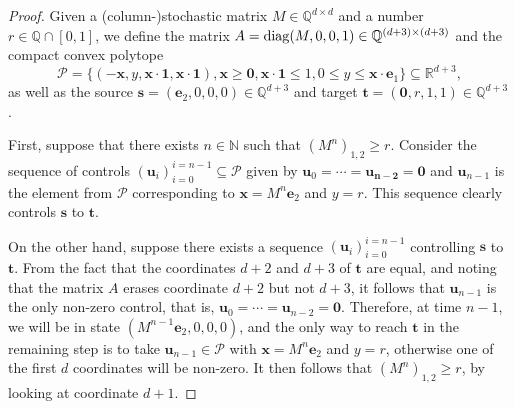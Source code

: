 \begin{proof}
Given a (column-)stochastic matrix $M \in \mathbb{Q}^{d \times d}$ and a number $r \in \mathbb{Q} \cap [0,1]$, we define the matrix $A=\operatorname{diag}(M, 0, 0, 1) \in \mathbb{Q}^{(d+3)\times (d+3)}$ and the compact convex polytope
\begin{equation*}
\mathcal{P} = \lbrace (-\boldsymbol{x}, y, \boldsymbol{x} \cdot \boldsymbol{1}, \boldsymbol{x} \cdot \boldsymbol{1}), \boldsymbol{x} \geq \boldsymbol{0}, \boldsymbol{x} \cdot \boldsymbol{1} \leq 1, 0 \leq y \leq \boldsymbol{x} \cdot \boldsymbol{e}_{1} \rbrace \subseteq \mathbb{R}^{d+3},
\end{equation*}
as well as the source $\boldsymbol{s} = (\boldsymbol{e}_{2}, 0, 0, 0) \in \mathbb{Q}^{d+3}$ and target $\boldsymbol{t} = (\boldsymbol{0}, r, 1, 1) \in \mathbb{Q}^{d+3}$.

First, suppose that there exists $n \in \mathbb{N}$ such that $\left( M^{n} \right)_{1,2} \geq r$. Consider the sequence of controls $\left( \boldsymbol{u}_{i} \right)_{i=0}^{i=n-1} \subseteq \mathcal{P}$ given by $\boldsymbol{u}_{0} = \cdots = \boldsymbol{u_{n-2}} = \boldsymbol{0}$ and $\boldsymbol{u}_{n-1}$ is the element from $\mathcal{P}$ corresponding to $\boldsymbol{x} = M^{n} \boldsymbol{e}_{2}$ and $y=r$.
This sequence clearly controls $\boldsymbol{s}$ to $\boldsymbol{t}$.

On the other hand, suppose there exists a sequence $\left( \boldsymbol{u}_{i} \right)_{i=0}^{i=n-1}$ controlling $\boldsymbol{s}$ to $\boldsymbol{t}$.
From the fact that the coordinates $d+2$ and $d+3$ of $\boldsymbol{t}$ are equal, and noting that the matrix $A$ erases coordinate $d+2$ but not $d+3$, it follows that $\boldsymbol{u}_{n-1}$ is the only non-zero control, that is, $\boldsymbol{u}_{0} = \cdots = \boldsymbol{u}_{n-2} = \boldsymbol{0}$.
Therefore, at time $n-1$, we will be in state $(M^{n-1} \boldsymbol{e}_{2}, 0, 0, 0)$, and the only way to reach $\boldsymbol{t}$ in the remaining step is to take $\boldsymbol{u}_{n-1} \in \mathcal{P}$ with $\boldsymbol{x} = M^{n} \boldsymbol{e}_{2}$ and $y=r$, otherwise one of the first $d$ coordinates will be non-zero. It then follows that $\left( M^{n} \right)_{1,2} \geq r$, by looking at coordinate $d+1$.
\end{proof}
